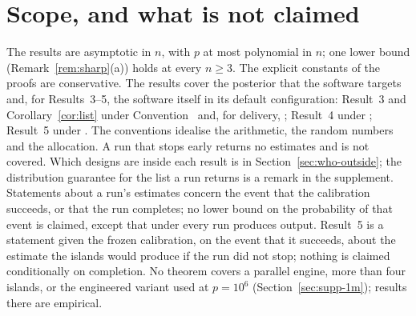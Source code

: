 \section{Scope, and what is not claimed}\label{sec:scope}

The results are asymptotic in $n$, with $p$ at most polynomial in $n$; one lower bound (Remark~\ref{rem:sharp}(a)) holds at
every $n\ge3$. The explicit constants of the proofs are conservative. The results cover the posterior that the software targets
and, for Results~3--5, the software itself in its default configuration: Result~3 and Corollary~\ref{cor:list} under
Convention~ and, for delivery, ; Result~4 under ; Result~5 under . The conventions idealise the
arithmetic, the random numbers and the allocation. A run that
stops early returns no estimates and is not covered. Which designs are inside each result is in
Section~\ref{sec:who-outside}; the distribution guarantee for the list a run returns is a remark in the supplement. Statements about a run's estimates concern the event that the
calibration succeeds, or that the run completes; no lower bound on the probability of that event is claimed, except that
under  every run produces output. Result~5 is a statement given the frozen calibration, on the event that it
succeeds, about the estimate the islands would produce if the run did not stop; nothing is claimed conditionally on
completion. No theorem covers a parallel engine, more than four islands, or the
engineered variant used at $p=10^6$ (Section~\ref{sec:supp-1m}); results there are empirical.
